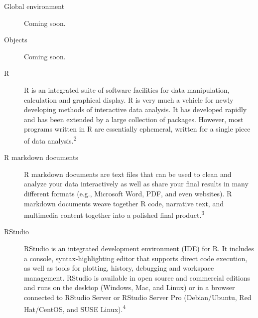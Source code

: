 \documentclass[
  letterpaper,
  DIV=11,
  numbers=noendperiod]{scrreprt}
\begin{document}
\begin{description}
\item[\label{glossary-global-environment}{Global
environment}]
Coming soon.
\item[\label{glossary-objects}{Objects}]
Coming soon.
\item[\label{glossary-r}{R}]
R is an integrated suite of software facilities for data manipulation,
calculation and graphical display. R is very much a vehicle for newly
developing methods of interactive data analysis. It has developed
rapidly and has been extended by a large collection of packages.
However, most programs written in R are essentially ephemeral, written
for a single piece of data analysis.\textsuperscript{2}
\item[\label{glossary-r-markdown-documents}{R markdown
documents}]
R markdown documents are text files that can be used to clean and
analyze your data interactively as well as share your final results in
many different formats (e.g., Microsoft Word, PDF, and even websites). R
markdown documents weave together R code, narrative text, and multimedia
content together into a polished final product.\textsuperscript{3}
\item[\label{glossary-rstudio}{RStudio}]
RStudio is an integrated development environment (IDE) for R. It
includes a console, syntax-highlighting editor that supports direct code
execution, as well as tools for plotting, history, debugging and
workspace management. RStudio is available in open source and commercial
editions and runs on the desktop (Windows, Mac, and Linux) or in a
browser connected to RStudio Server or RStudio Server Pro
(Debian/Ubuntu, Red Hat/CentOS, and SUSE Linux).\textsuperscript{4}
\end{description}
\end{document}
